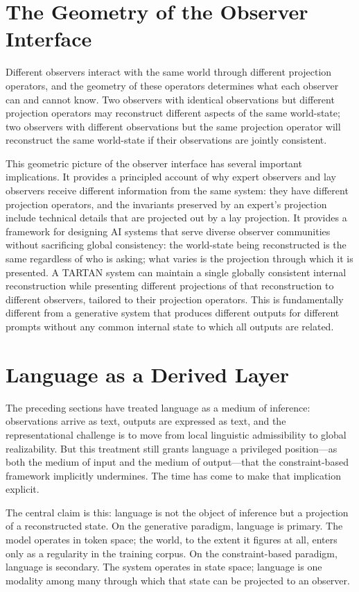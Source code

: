 \documentclass[11pt, oneside]{article}
\begin{document}
\section{The Geometry of the Observer Interface}

Different observers interact with the same world through different projection operators, and the geometry of these operators determines what each observer can and cannot know. Two observers with identical observations but different projection operators may reconstruct different aspects of the same world-state; two observers with different observations but the same projection operator will reconstruct the same world-state if their observations are jointly consistent.

This geometric picture of the observer interface has several important implications. It provides a principled account of why expert observers and lay observers receive different information from the same system: they have different projection operators, and the invariants preserved by an expert's projection include technical details that are projected out by a lay projection. It provides a framework for designing AI systems that serve diverse observer communities without sacrificing global consistency: the world-state being reconstructed is the same regardless of who is asking; what varies is the projection through which it is presented. A TARTAN system can maintain a single globally consistent internal reconstruction while presenting different projections of that reconstruction to different observers, tailored to their projection operators. This is fundamentally different from a generative system that produces different outputs for different prompts without any common internal state to which all outputs are related.

\section{Language as a Derived Layer}

The preceding sections have treated language as a medium of inference: observations arrive as text, outputs are expressed as text, and the representational challenge is to move from local linguistic admissibility to global realizability. But this treatment still grants language a privileged position---as both the medium of input and the medium of output---that the constraint-based framework implicitly undermines. The time has come to make that implication explicit.

The central claim is this: language is not the object of inference but a projection of a reconstructed state. On the generative paradigm, language is primary. The model operates in token space; the world, to the extent it figures at all, enters only as a regularity in the training corpus. On the constraint-based paradigm, language is secondary. The system operates in state space; language is one modality among many through which that state can be projected to an observer.
\end{document}
